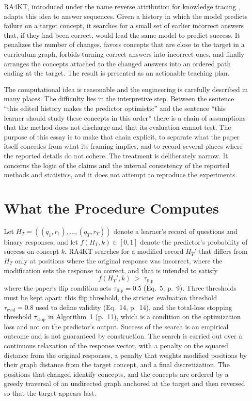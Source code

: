 \documentclass[11pt]{article}
\newcommand{\Hist}{H}
\begin{document}
RA4KT, introduced under the name reverse attribution for knowledge tracing \citep{ra4kt2026}, adapts this idea to answer sequences. Given a history in which the model predicts failure on a target concept, it searches for a small set of earlier incorrect answers that, if they had been correct, would lead the same model to predict success. It penalizes the number of changes, favors concepts that are close to the target in a curriculum graph, forbids turning correct answers into incorrect ones, and finally arranges the concepts attached to the changed answers into an ordered path ending at the target. The result is presented as an actionable teaching plan.

The computational idea is reasonable and the engineering is carefully described in many places. The difficulty lies in the interpretive step. Between the sentence ``this edited history makes the predictor optimistic'' and the sentence ``this learner should study these concepts in this order'' there is a chain of assumptions that the method does not discharge and that its evaluation cannot test. The purpose of this essay is to make that chain explicit, to separate what the paper itself concedes from what its framing implies, and to record several places where the reported details do not cohere. The treatment is deliberately narrow. It concerns the logic of the claims and the internal consistency of the reported methods and statistics, and it does not attempt to reproduce the experiments.

\section{What the Procedure Computes}

Let $\Hist_T = ((q_1,r_1),\dots,(q_T,r_T))$ denote a learner's record of questions and binary responses, and let $f(\Hist_T,k)\in[0,1]$ denote the predictor's probability of success on concept $k$. RA4KT searches for a modified record $\Hist_T'$ that differs from $\Hist_T$ only at positions where the original response was incorrect, where the modification sets the response to correct, and that is intended to satisfy
\[
f(\Hist_T',k)\;>\;\tau_{\mathrm{flip}}
\]
where the paper's flip condition sets $\tau_{\mathrm{flip}}=0.5$ (Eq.~5, p.~9). Three thresholds must be kept apart: this flip threshold, the stricter evaluation threshold $\tau_{\mathrm{eval}}=0.8$ used to define validity (Eq.~14, p.~14), and the total-loss stopping threshold $\tau_{\mathrm{stop}}$ in Algorithm~1 (p.~11), which is a condition on the optimization loss and not on the predictor's output. Success of the search is an empirical outcome and is not guaranteed by construction. The search is carried out over a continuous relaxation of the response vector, with a penalty on the squared distance from the original responses, a penalty that weights modified positions by their graph distance from the target concept, and a final discretization. The positions that changed identify concepts, and the concepts are ordered by a greedy traversal of an undirected graph anchored at the target and then reversed so that the target appears last.
\end{document}
